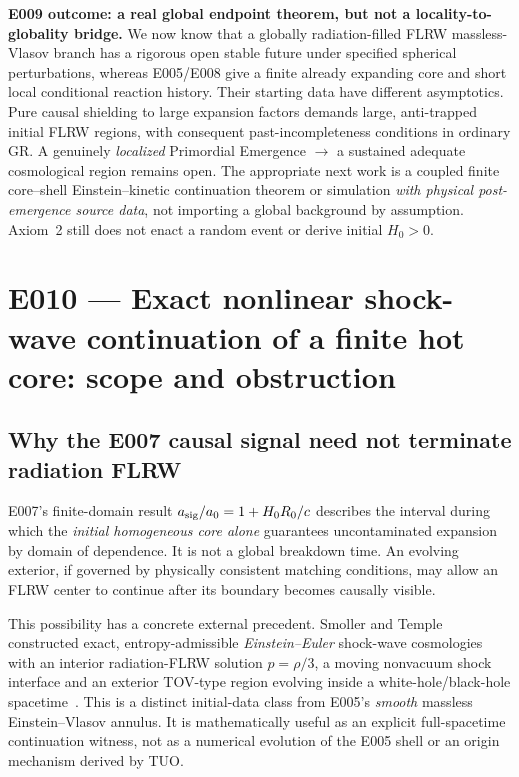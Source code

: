 \documentclass[11pt,a4paper]{article}
\theoremstyle{tmon}
\theoremstyle{definition}
\begin{document}
\begin{warningbox}
\textbf{E009 outcome: a real global endpoint theorem, but not a locality-to-globality bridge.} We now know that a globally radiation-filled FLRW massless-Vlasov branch has a rigorous open stable future under specified spherical perturbations, whereas E005/E008 give a finite already expanding core and short local conditional reaction history. Their starting data have different asymptotics. Pure causal shielding to large expansion factors demands large, anti-trapped initial FLRW regions, with consequent past-incompleteness conditions in ordinary GR. A genuinely \emph{localized} Primordial Emergence $\rightarrow$ a sustained adequate cosmological region remains open. The appropriate next work is a coupled finite core--shell Einstein--kinetic continuation theorem or simulation \emph{with physical post-emergence source data}, not importing a global background by assumption. Axiom~2 still does not enact a random event or derive initial $H_0>0$.
\end{warningbox}


\section{E010 --- Exact nonlinear shock-wave continuation of a finite hot core: scope and obstruction}\label{sec:e010}
\subsection{Why the E007 causal signal need not terminate radiation FLRW}
E007's finite-domain result $a_{\rm sig}/a_0=1+H_0R_0/c$ describes the interval during which the \emph{initial homogeneous core alone} guarantees uncontaminated expansion by domain of dependence. It is not a global breakdown time. An evolving exterior, if governed by physically consistent matching conditions, may allow an FLRW center to continue after its boundary becomes causally visible.

This possibility has a concrete external precedent. Smoller and Temple constructed exact, entropy-admissible \emph{Einstein--Euler} shock-wave cosmologies with an interior radiation-FLRW solution $p=\rho/3$, a moving nonvacuum shock interface and an exterior TOV-type region evolving inside a white-hole/black-hole spacetime~\cite{SmollerTemple2004,SmollerTemple2003}. This is a distinct initial-data class from E005's \emph{smooth} massless Einstein--Vlasov annulus. It is mathematically useful as an explicit full-spacetime continuation witness, not as a numerical evolution of the E005 shell or an origin mechanism derived by TUO.
\end{document}
